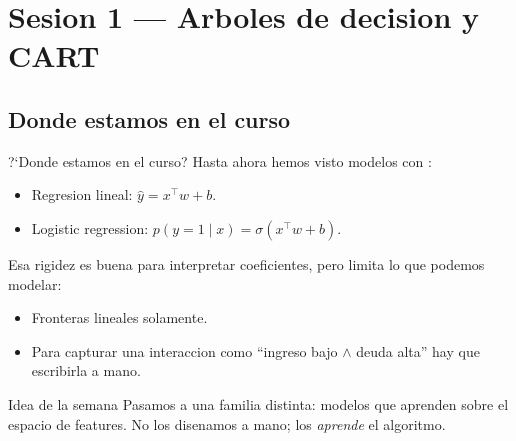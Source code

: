 \section[Arboles y CART]{Sesion 1 — Arboles de decision y CART\label{sec:trees-w15}}

\subsection{Donde estamos en el curso}

\begin{frame}{?`Donde estamos en el curso?}
Hasta ahora hemos visto modelos con :
\begin{itemize}\small
  \item Regresion lineal: $\hat y = x^\top w + b$.
  \item Logistic regression: $p(y=1\mid x) = \sigma(x^\top w + b)$.
\end{itemize}

\vspace{0.3em}
Esa rigidez es buena para interpretar coeficientes, pero limita lo que podemos modelar:
\begin{itemize}\small
  \item Fronteras lineales solamente.
  \item Para capturar una interaccion como ``ingreso bajo $\wedge$ deuda alta'' hay que escribirla a mano.
\end{itemize}

\vspace{0.3em}
\begin{block}{Idea de la semana}
\small
Pasamos a una familia distinta: modelos que aprenden  sobre el espacio de features. No los disenamos a mano; los \emph{aprende} el algoritmo.
\end{block}
\end{frame}

